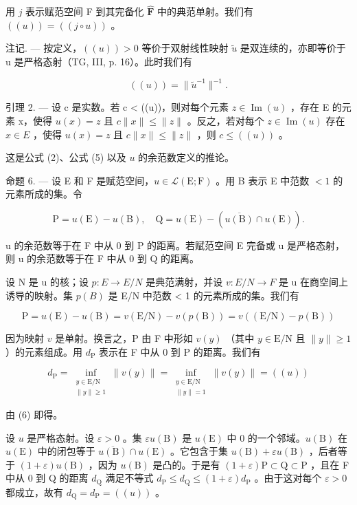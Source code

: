 用 \(j\) 表示赋范空间 F 到其完备化 \(\widehat{\mathbf{F}}\) 中的典范单射。我们有 \(((u)) = ((j \circ u))\) 。

注记. --- 按定义，\(((u)) > 0\) 等价于双射线性映射 \(\widetilde{u}\) 是双连续的，亦即等价于 u 是严格态射（TG, III, p. 16）。此时我们有

\[
((u)) = \| \widetilde {u} ^ {- 1} \| ^ {- 1}.\tag{10}
\]

引理 2. --- 设 c 是实数。若 c \textless{} ((u))，则对每个元素 \(z \in \operatorname{Im}(u)\) ，存在 E 的元素 x，使得 \(u(x) = z\) 且 \(c \|x\| \leqslant \|z\|\) 。反之，若对每个 \(z \in \operatorname{Im}(u)\) 存在 \(x \in E\) ，使得 \(u(x) = z\) 且 \(c \|x\| \leqslant \|z\|\) ，则 \(c \leqslant ((u))\) 。

这是公式 (2)、公式 (5) 以及 \(u\) 的余范数定义的推论。

命题 6. --- 设 E 和 F 是赋范空间，\(u \in \mathcal{L}(\mathrm{E};\mathrm{F})\) 。用 B 表示 E 中范数 \(< 1\) 的元素所成的集。令

\[
\mathrm{P} = u (\mathrm{E}) - u (\mathrm{B}), \quad \mathrm{Q} = u (\mathrm{E}) - (\overline {{u (\mathrm{B})}} \cap u (\mathrm{E})).
\]

u 的余范数等于在 F 中从 0 到 P 的距离。若赋范空间 E 完备或 u 是严格态射，则 u 的余范数等于在 F 中从 0 到 Q 的距离。

设 N 是 u 的核；设 \(p: E \to E/N\) 是典范满射，并设 \(v: E/N \to F\) 是 u 在商空间上诱导的映射。集 \(p(B)\) 是 E/N 中范数 \textless{} 1 的元素所成的集。我们有

\[
\mathrm{P} = u (\mathrm{E}) - u (\mathrm{B}) = v (\mathrm{E} / \mathrm{N}) - v (p (\mathrm{B})) = v ((\mathrm{E} / \mathrm{N}) - p (\mathrm{B}))
\]

因为映射 \(v\) 是单射。换言之，P 由 F 中形如 \(v(y)\) （其中 \(y \in \mathrm{E/N}\) 且 \(\|y\| \geqslant 1\) ）的元素组成。用 \(d_{\mathrm{P}}\) 表示在 F 中从 0 到 P 的距离。我们有

\[
d_{\mathrm{P}} = \inf_{\substack{y\in \mathrm{E} / \mathrm{N}\\ \| y\| \geqslant 1}}\| v(y)\| = \inf_{\substack{y\in \mathrm{E} / \mathrm{N}\\ \| y\| = 1}}\| v(y)\| = ((u))
\]

由 (6) 即得。

设 \(u\) 是严格态射。设 \(\varepsilon > 0\) 。集 \(\varepsilon u(\mathrm{B})\) 是 \(u(\mathrm{E})\) 中 0 的一个邻域。\(u(\mathrm{B})\) 在 \(u(\mathrm{E})\) 中的闭包等于 \(\overline{u(\mathrm{B})} \cap u(\mathrm{E})\) 。它包含于集 \(u(\mathrm{B}) + \varepsilon u(\mathrm{B})\) ，后者等于 \((1 + \varepsilon)u(\mathrm{B})\) ，因为 \(u(\mathrm{B})\) 是凸的。于是有 \((1 + \varepsilon)\mathrm{P} \subset \mathrm{Q} \subset \mathrm{P}\) ，且在 F 中从 0 到 Q 的距离 \(d_{\mathrm{Q}}\) 满足不等式 \(d_{\mathrm{P}} \leqslant d_{\mathrm{Q}} \leqslant (1 + \varepsilon)d_{\mathrm{P}}\) 。由于这对每个 \(\varepsilon > 0\) 都成立，故有 \(d_{\mathrm{Q}} = d_{\mathrm{P}} = ((u))\) 。

